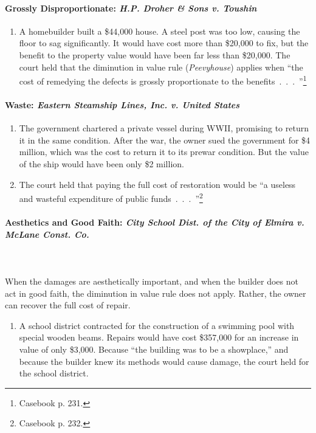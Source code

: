 \paragraph{Grossly Disproportionate: \emph{H.P. Droher \& Sons v. Toushin}}

\begin{enumerate}
    \item A homebuilder built a \$44,000 house. A steel post was too low, 
    causing the floor to sag significantly. It would have cost more than 
    \$20,000 to fix, but the benefit to the property value would have been far 
    less than \$20,000. The court held that the diminution in value rule 
    (\emph{Peevyhouse}) applies when ``the cost of remedying the defects is 
    grossly proportionate to the benefits~.~.~.~''\footnote{Casebook p. 231.}
\end{enumerate}

\paragraph{Waste: \emph{Eastern Steamship Lines, Inc. v. United States}}

\begin{enumerate}
    \item The government chartered a private vessel during WWII, promising to 
    return it in the same condition. After the war, the owner sued the 
    government for \$4 million, which was the cost to return it to its prewar 
    condition. But the value of the ship would have been only \$2 million. 
    \item The court held that paying the full cost of restoration would be ``a 
    useless and wasteful expenditure of public 
    funds~.~.~.~''\footnote{Casebook p. 232.}
\end{enumerate}

\paragraph{Aesthetics and Good Faith: \emph{City School Dist. of the City of 
Elmira v.  McLane Const. Co.}}
~\\\\
When the damages are aesthetically important, and when the builder does not 
act in good faith, the diminution in value rule does not apply. Rather, the 
owner can recover the full cost of repair.

\begin{enumerate}
    \item A school district contracted for the construction of a swimming pool 
    with special wooden beams. Repairs would have cost \$357,000 for an 
    increase in value of only \$3,000. Because ``the building was to be a 
    showplace,'' and because the builder knew its methods would cause damage, 
    the court held for the school district.
\end{enumerate}

